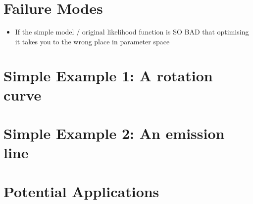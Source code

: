 \documentclass[letterpaper, 11pt]{article}
\begin{document}
\section{Failure Modes}
\begin{itemize}
\item If the simple model / original likelihood function is SO BAD that optimising it takes you to the wrong place in parameter space
\end{itemize}

\section{Simple Example 1: A rotation curve}

\section{Simple Example 2: An emission line}


\section{Potential Applications}
\end{document}
